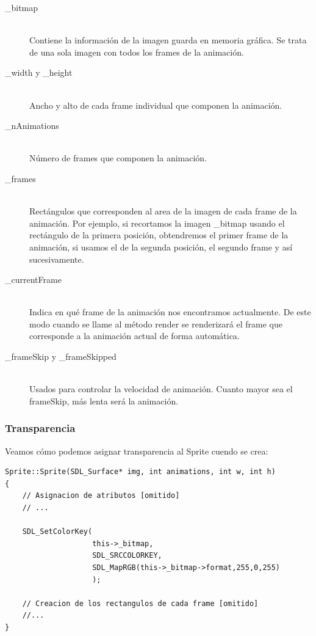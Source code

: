 \documentclass[parskip=half*]{scrartcl}
\begin{document}
		\begin{description}
			\item[\_bitmap] \hfill \\	Contiene la informaci\'on de la imagen guarda en memoria gr\'afica. Se trata de una sola imagen con todos los frames de la animaci\'on.

			\item[\_width y \_height] \hfill \\	Ancho y alto de cada frame individual que componen la animaci\'on.

			\item[\_nAnimations] \hfill \\	N\'umero de frames que componen la animaci\'on.

			\item[\_frames] \hfill \\	Rect\'angulos que corresponden al area de la imagen de cada frame de la animaci\'on. Por ejemplo, si recortamos la imagen \_bitmap usando el rect\'angulo de la primera posici\'on, obtendremos el primer frame de la animaci\'on, si usamos el de la segunda posici\'on, el segundo frame y as\'i sucesivamente.

			\item[\_currentFrame] \hfill \\	Indica en qu\'e frame de la animaci\'on nos encontramos actualmente. De este modo cuando se llame al m\'etodo render se renderizar\'a el frame que corresponde a la animaci\'on actual de forma autom\'atica.

			\item[\_frameSkip y \_frameSkipped] \hfill \\	Usados para controlar la velocidad de animaci\'on. Cuanto mayor sea el frameSkip, m\'as lenta ser\'a la animaci\'on.
		\end{description}

		\subsubsection{Transparencia}
			Veamos c\'omo podemos asignar transparencia al Sprite cuendo se crea:

			\begin{lstlisting}
Sprite::Sprite(SDL_Surface* img, int animations, int w, int h)
{
	// Asignacion de atributos [omitido]
	// ...

	SDL_SetColorKey(
					this->_bitmap,
					SDL_SRCCOLORKEY,
					SDL_MapRGB(this->_bitmap->format,255,0,255)
					);

	// Creacion de los rectangulos de cada frame [omitido]
	//...
}
			\end{lstlisting}
\end{document}
